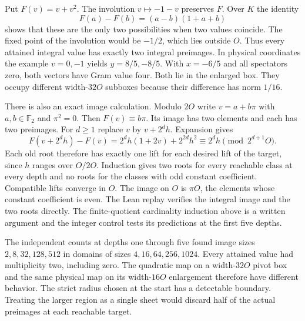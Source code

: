 \documentclass[12pt,letterpaper]{article}
\begin{document}
Put $F(v)=v+v^2$. The involution $v\mapsto-1-v$ preserves $F$. Over $K$ the identity
\[
 F(a)-F(b)=(a-b)(1+a+b)
\]
shows that these are the only two possibilities when two values coincide. The fixed point of the involution would be $-1/2$, which lies outside $O$. Thus every attained integral value has exactly two integral preimages. In physical coordinates the example $v=0,-1$ yields $y=8/5,-8/5$. With $x=-6/5$ and all spectators zero, both vectors have Gram value four. Both lie in the enlarged box. They occupy different width-$32O$ subboxes because their difference has norm $1/16$.

There is also an exact image calculation. Modulo $2O$ write $v=a+b\pi$ with $a,b\in\mathbb F_2$ and $\pi^2=0$. Then $F(v)\equiv b\pi$. Its image has two elements and each has two preimages. For $d\ge1$ replace $v$ by $v+2^d h$. Expansion gives
\[
 F(v+2^d h)-F(v)=2^dh(1+2v)+2^{2d}h^2
              \equiv 2^d h\pmod {2^{d+1}O}.
\]
Each old root therefore has exactly one lift for each desired lift of the target, since $h$ ranges over $O/2O$. Induction gives two roots for every reachable class at every depth and no roots for the classes with odd constant coefficient. Compatible lifts converge in $O$. The image on $O$ is $\pi O$, the elements whose constant coefficient is even. The Lean replay verifies the integral image and the two roots directly. The finite-quotient cardinality induction above is a written argument and the integer control tests its predictions at the first five depths.

The independent counts at depths one through five found image sizes $2,8,32,128,512$ in domains of sizes $4,16,64,256,1024$. Every attained value had multiplicity two, including zero. The quadratic map on a width-$32O$ pivot box and the same physical map on its width-$16O$ enlargement therefore have different behavior. The strict radius chosen at the start has a detectable boundary. Treating the larger region as a single sheet would discard half of the actual preimages at each reachable target.
\end{document}

